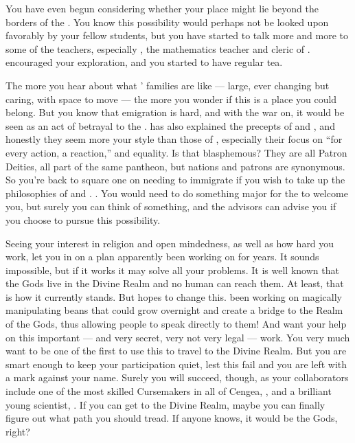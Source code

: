 \documentclass[char]{GL2020}
\begin{document}
You have even begun considering whether your place might lie beyond the borders of the \pTech{}. You know this possibility would perhaps not be looked upon favorably by your fellow \pTech{} students, but you have started to talk more and more to some of the \pShip{} teachers, especially \cFlowPriest{}, the mathematics teacher and cleric of \cFlow{}. \cFlowPriest{} encouraged your exploration, and you started to have regular tea. 

The more you hear about what \pShippies{}’ families are like — large, ever changing but caring, with space to move — the more you wonder if this is a place you could belong. But you know that emigration is hard, and with the war on, it would be seen as an act of betrayal to the \pTech{}. \cFlowPriest{} has also explained the precepts of \cEbbFull{\intro} and \cFlowFull{\intro}, and honestly they seem more your style than those of \cTechGod{}, especially their focus on ``for every action, a reaction,'' and equality. Is that blasphemous? They are all Patron Deities, all part of the same pantheon, but nations and patrons are synonymous. So you’re back to square one on needing to immigrate if you wish to take up the philosophies of \cEbb{} and \cFlow{}. . You would need to do something major for the \pShippies{} to welcome you, but surely you can think of something, and the \pShippie{} advisors can advise you if you choose to pursue this possibility.

Seeing your interest in \cFlowPriest{\their} religion and open mindedness, as well as how hard you work, \cFlowPriest{} let you in on a plan \cFlowPriest{\theyhave} apparently been working on for years. It sounds impossible, but if it works it may solve all your problems. It is well known that the Gods live in the Divine Realm and no human can reach them. At least, that is how it currently stands. But \cFlowPriest{} hopes to change this. \cFlowPriest{\Theyhave} been working on magically manipulating beans that could grow overnight and create a bridge to the Realm of the Gods, thus allowing people to speak directly to them! And \cFlowPriest{\they} want\cFlowPriest{\verbs} your help on this important — and very secret, very not very legal — work. You very much want to be one of the first to use this to travel to the Divine Realm. But you are smart enough to keep your participation quiet, lest this fail and you are left with a mark against your name. Surely you will succeed, though, as your collaborators include one of the most skilled Cursemakers in all of Cengea, \cCurse{\intro}, and a brilliant young \pTech{} scientist, \cAssistantScientist{\intro}. If you can get to the Divine Realm, maybe you can finally figure out what path you should tread. If anyone knows, it would be the Gods, right? 
\end{document}

